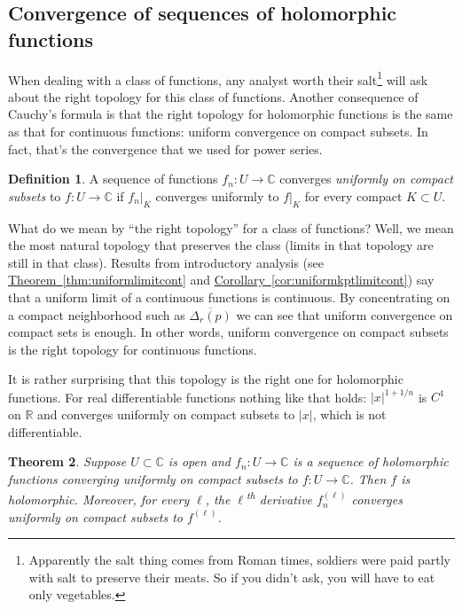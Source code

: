 \documentclass[12pt,openany]{book}
\newcommand{\sabs}[1]{\lvert {#1} \rvert}
\newcommand{\C}{{\mathbb{C}}}
\newcommand{\R}{{\mathbb{R}}}
\newcommand{\myindex}[1]{#1\index{#1}}
\newcommand{\myquote}[1]{``#1''}
\theoremstyle{plain}
\newtheorem{thm}{Theorem}[section]
\theoremstyle{remark}
\theoremstyle{definition}
\newtheorem{defn}[thm]{Definition}
\theoremstyle{exercise}
\theoremstyle{example}
\newcommand{\thmref}[1]{\hyperref[#1]{Theorem~\ref*{#1}}}
\newcommand{\corref}[1]{\hyperref[#1]{Corollary~\ref*{#1}}}
\begin{document}
\subsection{Convergence of sequences of holomorphic functions}

When dealing with a class of functions, any analyst worth their
salt\footnote{Apparently the salt thing
comes from Roman times, soldiers were
paid partly with salt to preserve their meats.  So if you didn't ask,
you will have to eat only vegetables.} will ask about the right topology for this class of
functions.
Another consequence of Cauchy's formula is that the right topology for
holomorphic functions is the same as that for continuous functions: uniform
convergence on compact subsets.  In fact, that's the convergence that we
used for power series.

\begin{defn}
A sequence of functions $f_n \colon U \to \C$ converges
\emph{\myindex{uniformly on compact subsets}}%
to $f \colon U \to \C$ if
$f_n|_K$ converges uniformly to $f|_K$
for every compact $K \subset U$.
\end{defn}

What do we mean by \myquote{the right topology} for a class of functions?
Well, we mean the most natural
topology that preserves the class (limits in that topology are still in that
class).  
Results from introductory analysis
(see \thmref{thm:uniformlimitcont} and \corref{cor:uniformkptlimitcont})
say that a uniform limit of a continuous functions is continuous.
By concentrating on a compact neighborhood such as $\overline{\Delta_r(p)}$
we can see that uniform convergence on compact sets is enough.
In other words, uniform convergence on compact subsets is the right topology
for continuous functions.

It is rather surprising that this topology is the right one for holomorphic
functions.  For real
differentiable functions nothing like that holds: $\sabs{x}^{1+1/n}$
is $C^1$ on $\R$ and converges uniformly on compact subsets to $\sabs{x}$,
which is not differentiable.

\begin{thm} \label{thm:unifoncompact}
Suppose $U \subset \C$ is open and $f_n \colon U \to \C$ is a sequence
of holomorphic functions converging uniformly on compact subsets to
$f \colon U \to \C$.  Then $f$ is holomorphic.
Moreover, for every $\ell$, the $\ell$\textsuperscript{th} derivative
$f_n^{(\ell)}$ converges uniformly on compact subsets to $f^{(\ell)}$.
\end{thm}
\end{document}
